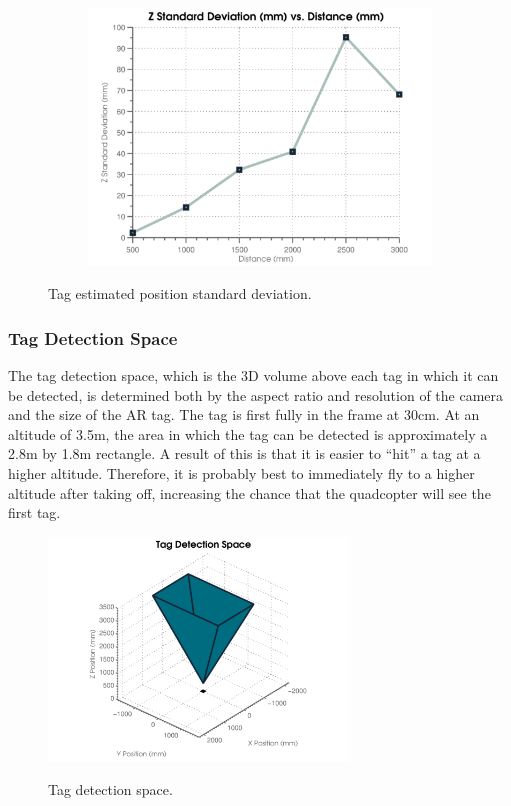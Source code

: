 \begin{figure}[ht]
\begin{subfigure}[b]{0.32\textwidth}
			                \label{fig:tagvary}
			        \end{subfigure}
			        ~
			        \begin{subfigure}[b]{0.32\textwidth}
			                \centering
			                \includegraphics[width=\textwidth]{../images/artest_z.png}
			                \label{fig:tagvarz}
			        \end{subfigure}
			        \caption{Tag estimated position standard deviation.}\label{fig:tagvar}
			\end{figure}

		\subsubsection{Tag Detection Space}

			The tag detection space, which is the 3D volume above each tag in which it can be detected, is determined both by the aspect ratio and resolution of the camera and the size of the AR tag. The tag is first fully in the frame at 30cm. At an altitude of 3.5m, the area in which the tag can be detected is approximately a 2.8m by 1.8m rectangle. A result of this is that it is easier to ``hit'' a tag at a higher altitude. Therefore, it is probably best to immediately fly to a higher altitude after taking off, increasing the chance that the quadcopter will see the first tag. 

			\begin{figure}[ht]
			        \centering
			        \includegraphics[width=300px]{../images/tag_detection.png}
			        \label{fig:tagdetection}
			        \caption{Tag detection space.}
			\end{figure}

